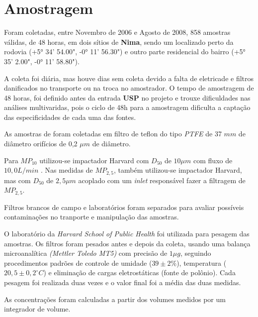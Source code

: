 \section{Amostragem}

Foram coletadas, entre Novembro de 2006 e Agosto de 2008, 858 amostras válidas, 
de 48 horas, em dois sítios de \textbf{Nima}, sendo um localizado perto da rodovia
(+5° 34' 54.00", -0° 11' 56.30") e outro parte residencial do 
bairro (+5° 35' 2.00", -0° 11' 58.80").

A coleta foi diária, mas houve dias sem coleta devido a falta de eletricade e
filtros danificados no transporte ou na troca no amostrador. 
O tempo de amostragem de 48 horas, foi definido antes da entrada \textbf{USP} 
no projeto e trouxe dificuldades nas análises multivaridas, pois o
ciclo de 48h para a amostragem dificulta a captação das especificidades 
de cada uma das fontes.

As amostras de foram coletadas em filtro de teflon do tipo 
\textit{PTFE} de 37 $mm$ de diâmetro orifícios de 0,2 $\mu m$ de diâmetro. 

Para $MP_{10}$ utilizou-se impactador Harvard com $D_{50}$ de $10 \mu m$ 
com fluxo de $10,0 L/min$ \cite{marple1987}. 
Nas medidas de $MP_{2,5}$, também utilizou-se impactador Harvard, 
mas com $D_{50}$ de $2,5 \mu m$ acoplado com um \textit{inlet} 
responsável fazer a filtragem de $MP_{2,5}$.

Filtros brancos de campo e laboratórios foram separados para avaliar 
possíveis contaminações no tranporte e manipulação das amostras. 

O laboratório da \textit{Harvard School of Public Health} foi
utilizada para pesagem das amostras.
Os filtros foram pesados antes e depois da coleta, usando uma balança 
microanalítica \textit{(Mettler Toledo MT5)} com precisão de $1 \mu g$, 
seguindo procedimentos padrões de controle de umidade ($39 \pm 2 \%$), 
temperatura ($20,5 \pm 0,2 ^{\circ} C$) e eliminação de cargas eletrostáticas 
(fonte de polônio).
Cada pesagem foi realizada duas vezes e o valor final foi a média das 
duas medidas.

As concentrações foram calculadas a partir dos volumes 
medidos por um integrador de volume.



